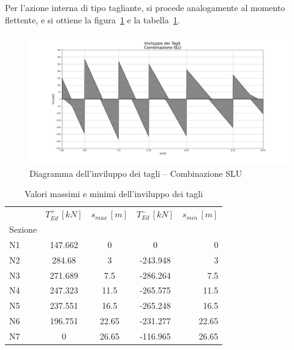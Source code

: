   \cleardoublepage
  Per l'azione interna di tipo tagliante, si procede analogamente al momento flettente, e si ottiene la figura~\ref{fig:shearEnvelope_slu} e la tabella~\ref{tab:shearEnvelope_slu}.
  
  \begin{figure}
 	\centering
 	\includegraphics[width=\textwidth]{../../export/img/shearEnvelope_slu}
 	\caption{Diagramma dell'inviluppo dei tagli -- Combinazione SLU}
 	\label{fig:shearEnvelope_slu}
 \end{figure}
 
 \begin{table}
  	\centering
  	\caption{Valori massimi e minimi dell'inviluppo dei tagli}
  	\label{tab:shearEnvelope_slu}
  	\begin{tabular}{lcccr}
		\toprule
		& $T_{Ed}^+\,[kN]$ & $s_{max}\,[m]$ & $T_{Ed}^-\,[kN]$ & $s_{min}\,[m]$ \\
		Sezione &             &          &             &          \\
		\midrule
		N1      &   147.662 &        0 &         0 &        0 \\
		N2      &    284.68 &        3 &  -243.948 &        3 \\
		N3      &   271.689 &      7.5 &  -286.264 &      7.5 \\
		N4      &   247.323 &     11.5 &  -265.575 &     11.5 \\
		N5      &   237.551 &     16.5 &  -265.248 &     16.5 \\
		N6      &   196.751 &    22.65 &  -231.277 &    22.65 \\
		N7      &         0 &    26.65 &  -116.965 &    26.65 \\
		\bottomrule
	\end{tabular}
  \end{table}
  

  
